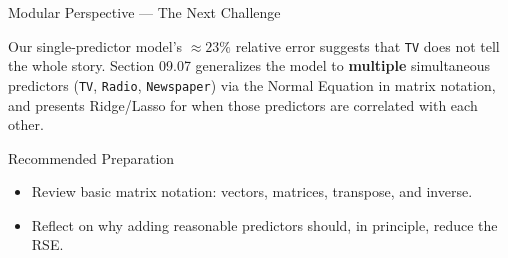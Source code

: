 \documentclass[10pt, aspectratio=169]{beamer}
\begin{document}
\begin{frame}{Modular Perspective --- The Next Challenge}
  \scriptsize
  \begin{retoclase}
    Our single-predictor model's $\approx23\%$ relative error suggests that \texttt{TV} does not tell the whole story. Section 09.07 generalizes the model to \textbf{multiple} simultaneous predictors (\texttt{TV}, \texttt{Radio}, \texttt{Newspaper}) via the Normal Equation in matrix notation, and presents Ridge/Lasso for when those predictors are correlated with each other.
  \end{retoclase}

  \vspace{0.08cm}
  \pause
  \begin{alertblock}{Recommended Preparation}
    \begin{itemize}\itemsep=0.06cm
      \item Review basic matrix notation: vectors, matrices, transpose, and inverse.
      \item Reflect on why adding reasonable predictors should, in principle, reduce the RSE.
    \end{itemize}
  \end{alertblock}
\end{frame}
\end{document}
